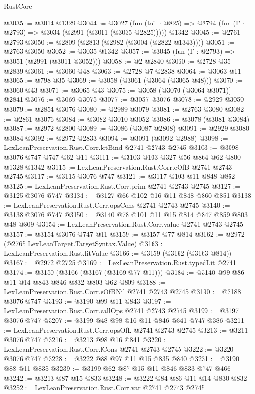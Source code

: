 \begin{lexlean}{RustCore}
\begin{coremodule}
@3035 := @3014 @1329
@3044 := @3027
    (fun (tail : @825) => @2794 (fun (Γ : @2793) => @3034 (@2991 (@3011 (@3035 @2825)))))
    @1342
@3045 := @2761 @2793
@3050 := @2809 (@2813 (@2982 (@3004 (@2822 @1343))))
@3051 := @2763 @3050
@3052 := @3035 @1342
@3057 := @3045 (fun (Γ : @2793) => @3051 (@2991 (@3011 @3052)))
@3058 := @2 @2840
@3060 := @2728 @35 @2839
@3061 := @3060 @48
@3063 := @2728 @7 @2838
@3064 := @3063 @11
@3065 := @798 @35
@3069 := @3058 (@3061 (@3064 (@3065 @48)))
@3070 := @3060 @43
@3071 := @3065 @43
@3075 := @3058 (@3070 (@3064 @3071)) @2841
@3076 := @3069 @3075
@3077 := @3057 @3076
@3078 := @2929 @3050
@3079 := @2854 @3076
@3080 := @2989 @3079
@3081 := @2763 @3080
@3082 := @2861 @3076
@3084 := @3082 @3010 @3052
@3086 := @3078 (@3081 @3084)
@3087 := @2972 @2800
@3089 := @3086 (@3087 @2808)
@3091 := @2929 @3080 @3084
@3092 := @2972 @2833
@3094 := @3091 (@3092 @2988)
@3098 := LexLeanPreservation.Rust.Corr.letBind @2741 @2743 @2745
@3103 := @3098 @3076 @747 @747 @62 @11
@3111 := @3103 @103 @327 @56 @864 @62 @800 @1328 @1342
@3115 := LexLeanPreservation.Rust.Corr.eOfB @2741 @2743 @2745
@3117 := @3115 @3076 @747
@3121 := @3117 @103 @11 @848 @862
@3125 := LexLeanPreservation.Rust.Corr.prim @2741 @2743 @2745
@3127 := @3125 @3076 @747
@3134 := @3127 @66 @102 @16 @11 @848 @860 @851
@3138 := LexLeanPreservation.Rust.Corr.opsCons @2741 @2743 @2745
@3140 := @3138 @3076 @747
@3150 := @3140 @78 @101 @11 @15 @814 @847 @859 @803 @48 @809
@3154 := LexLeanPreservation.Rust.Corr.value @2741 @2743 @2745
@3157 := @3154 @3076 @747 @11
@3159 := @3157 @77 @814
@3162 := @2972 (@2765 LexLeanTarget.TargetSyntax.Value)
@3163 := LexLeanPreservation.Rust.litValue
@3166 := @3159 (@3162 (@3163 @814))
@3167 := @2972 @2725
@3169 := LexLeanPreservation.Rust.typedLit @2741
@3174 := @3150 (@3166 (@3167 (@3169 @77 @11)))
@3184 := @3140 @99 @86 @11 @14 @843 @846 @832 @803 @62 @809
@3188 := LexLeanPreservation.Rust.Corr.eOfBNil @2741 @2743 @2745
@3190 := @3188 @3076 @747
@3193 := @3190 @99 @11 @843
@3197 := LexLeanPreservation.Rust.Corr.callOps @2741 @2743 @2745
@3199 := @3197 @3076 @747
@3207 := @3199 @48 @98 @16 @11 @846 @841 @747 @386
@3211 := LexLeanPreservation.Rust.Corr.opsOfL @2741 @2743 @2745
@3213 := @3211 @3076 @747
@3216 := @3213 @98 @16 @841
@3220 := LexLeanPreservation.Rust.Corr.lCons @2741 @2743 @2745
@3222 := @3220 @3076 @747
@3228 := @3222 @88 @97 @11 @15 @835 @840
@3231 := @3190 @88 @11 @835
@3239 := @3199 @62 @87 @15 @11 @846 @833 @747 @466
@3242 := @3213 @87 @15 @833
@3248 := @3222 @84 @86 @11 @14 @830 @832
@3252 := LexLeanPreservation.Rust.Corr.var @2741 @2743 @2745

\end{coremodule}
\end{lexlean}
